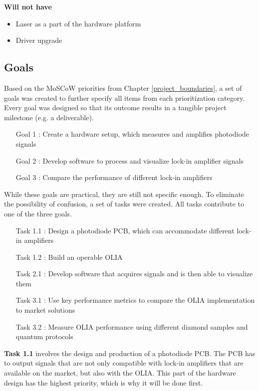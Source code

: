 \textbf{Will not have}
\begin{itemize}
	\item Laser as a part of the hardware platform
	\item Driver upgrade
\end{itemize}


\subsection{Goals} \label{chap:goals}
Based on the MoSCoW priorities from Chapter \ref{project_boundaries}, a set of goals was created to further specify all items from each prioritization category. Every goal was designed so that its outcome results in a tangible project milestone (e.g. a deliverable).

\begin{itemize}
	\item[Goal 1]: Create a hardware setup, which measures and amplifies photodiode signals
	\item[Goal 2]: Develop software to process and visualize lock-in amplifier signals
	\item[Goal 3]: Compare the performance of different lock-in amplifiers
\end{itemize}

While these goals are practical, they are still not specific enough. To eliminate the possibility of confusion, a set of tasks were created. All tasks contribute to one of the three goals.

\begin{itemize}
	\item[Task 1.1]: Design a photodiode PCB, which can accommodate different lock-in amplifiers
	\item[Task 1.2]: Build an operable OLIA
	\item[Task 2.1]: Develop software that acquires signals and is then able to visualize them
	\item[Task 3.1]: Use key performance metrics to compare the OLIA implementation to market solutions
	\item[Task 3.2]: Measure OLIA performance using different diamond samples and quantum protocols
\end{itemize}

\textbf{Task 1.1} involves the design and production of a photodiode PCB. The PCB has to output signals that are not only compatible with lock-in amplifiers that are available on the market, but also with the OLIA. This part of the hardware design has the highest priority, which is why it will be done first. 

